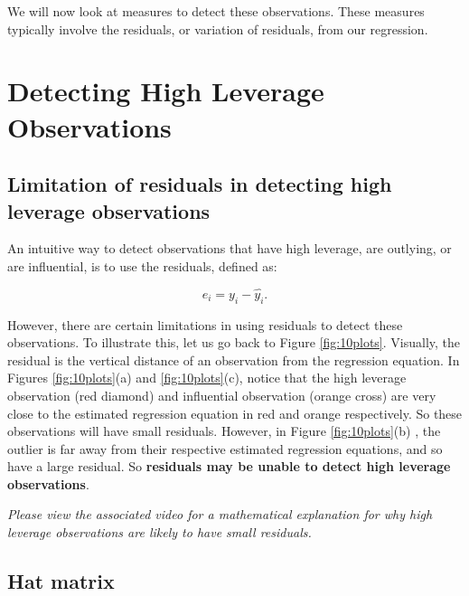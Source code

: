 \documentclass[
]{book}
\begin{document}
We will now look at measures to detect these observations. These measures typically involve the residuals, or variation of residuals, from our regression.

\hypertarget{detecting-high-leverage-observations}{%
\section{Detecting High Leverage Observations}\label{detecting-high-leverage-observations}}

\hypertarget{limitation-of-residuals-in-detecting-high-leverage-observations}{%
\subsection{Limitation of residuals in detecting high leverage observations}\label{limitation-of-residuals-in-detecting-high-leverage-observations}}

An intuitive way to detect observations that have high leverage, are outlying, or are influential, is to use the residuals, defined as:

\begin{equation} 
e_i = y_i - \hat{y_i}.
\label{eq:10res}
\end{equation}

However, there are certain limitations in using residuals to detect these observations. To illustrate this, let us go back to Figure \ref{fig:10plots}. Visually, the residual is the vertical distance of an observation from the regression equation. In Figures \ref{fig:10plots}(a) and \ref{fig:10plots}(c), notice that the high leverage observation (red diamond) and influential observation (orange cross) are very close to the estimated regression equation in red and orange respectively. So these observations will have small residuals. However, in Figure \ref{fig:10plots}(b) , the outlier is far away from their respective estimated regression equations, and so have a large residual. So \textbf{residuals may be unable to detect high leverage observations}.

\emph{Please view the associated video for a mathematical explanation for why high leverage observations are likely to have small residuals.}

\hypertarget{hat-matrix}{%
\subsection{Hat matrix}\label{hat-matrix}}
\end{document}
